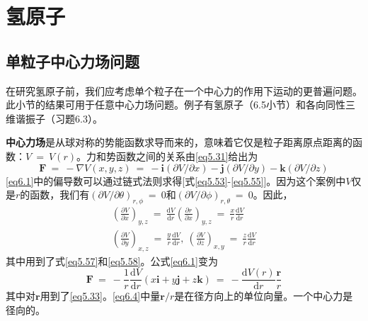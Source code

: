 \documentclass[12pt,a4paper,openany]{ctexbook}
\newcommand{\dd}[1]{\mathrm{d} #1}
\newcommand{\paren}[1]{\left( #1 \right)}
\begin{document}
\chapter{氢原子}
\section{单粒子中心力场问题}
\begin{flushleft}
    \setlength{\parindent}{2em}
在研究氢原子前，我们应考虑单个粒子在一个中心力的作用下运动的更普遍问题。此小节的结果可用于任意中心力场问题。例子有氢原子（6.5小节）和各向同性三维谐振子（习题6.3）。

\textbf{中心力场}是从球对称的势能函数求导而来的，意味着它仅是粒子距离原点距离的函数：$V\ =\ V(r)$。力和势函数之间的关系由\eqref{eq5.31}给出为
\begin{equation}
    \boldsymbol{F}\ =\ -\nabla V(x,y,z)\ =\ -\boldsymbol{i}(\partial V/\partial x)-\boldsymbol{j}(\partial V/\partial y)-\boldsymbol{k}(\partial V/\partial z) \label{eq6.1}
\end{equation}
\eqref{eq6.1}中的偏导数可以通过链式法则求得[式\eqref{eq5.53}-\eqref{eq5.55}]。因为这个案例中$V$仅是$r$的函数，我们有$(\partial V/\partial\theta)_{r,\phi}\ =\ 0$和$(\partial V/\partial\phi)_{r,\theta}\ =\ 0$。因此，
\begin{gather}
    \paren{\frac{\partial V}{\partial x}}_{y,z}\ =\ \frac{\dd V}{\dd r}\paren{\frac{\partial r}{\partial x}}_{y,z}\ =\ \frac{x}{r}\frac{\dd V}{\dd r} \label{eq6.2} \\
    \paren{\frac{\partial V}{\partial y}}_{x,z}\ =\ \frac{y}{r}\frac{\dd V}{\dd r},\ \paren{\frac{\partial V}{\partial z}}_{x,y}\ =\ \frac{z}{r}\frac{\dd V}{\dd r} \label{eq6.3}
\end{gather}
其中用到了式\eqref{eq5.57}和\eqref{eq5.58}。公式\eqref{eq6.1}变为
\begin{equation}
    \boldsymbol{F}\ =\ -\frac{1}{r}\frac{\dd V}{\dd r}(x\boldsymbol{i}+y\boldsymbol{j}+z\boldsymbol{k})\ =\ -\frac{\dd V(r)}{\dd r}\frac{\boldsymbol{r}}{r} \label{eq6.4}
\end{equation}
其中对$\boldsymbol{r}$用到了\eqref{eq5.33}。\eqref{eq6.4}中量$\boldsymbol{r}/r$是在径方向上的单位向量。一个中心力是径向的。


\end{flushleft}
\end{document}
